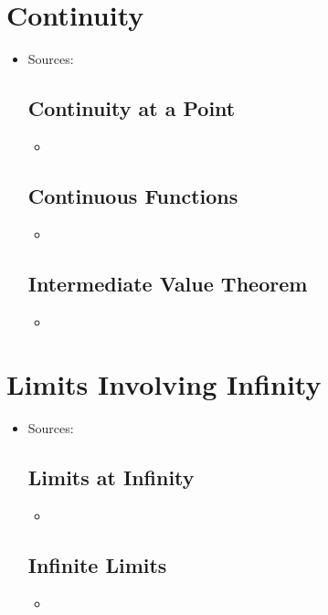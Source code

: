\section{Continuity}
\begin{itemize}
  \item Sources:
  
  \subsection{Continuity at a Point}
  \begin{itemize}
    \item 
  \end{itemize}

  \subsection{Continuous Functions}
  \begin{itemize}
    \item 
  \end{itemize}
  
  \subsection{Intermediate Value Theorem}
  \begin{itemize}
    \item 
  \end{itemize}
  
\end{itemize}

\section{Limits Involving Infinity}
\begin{itemize}
  \item Sources:

  \subsection{Limits at Infinity}
  \begin{itemize}
    \item 
  \end{itemize}

  \subsection{Infinite Limits}
  \begin{itemize}
    \item 
  \end{itemize}
  
  
\end{itemize}







